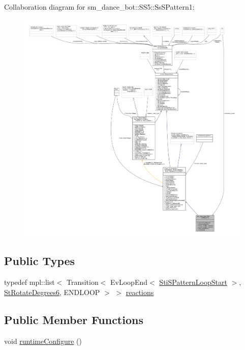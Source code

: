 Collaboration diagram for sm\+\_\+dance\+\_\+bot\+:\+:S\+S5\+:\+:Ss\+S\+Pattern1\+:
\nopagebreak
\begin{figure}[H]
\begin{center}
\leavevmode
\includegraphics[width=350pt]{structsm__dance__bot_1_1SS5_1_1SsSPattern1__coll__graph}
\end{center}
\end{figure}
\subsection*{Public Types}
\begin{DoxyCompactItemize}
\item 
typedef mpl\+::list$<$ Transition$<$ Ev\+Loop\+End$<$ \hyperlink{structsm__dance__bot_1_1s__pattern__states_1_1StiSPatternLoopStart}{Sti\+S\+Pattern\+Loop\+Start} $>$, \hyperlink{structsm__dance__bot_1_1StRotateDegrees6}{St\+Rotate\+Degrees6}, E\+N\+D\+L\+O\+OP $>$ $>$ \hyperlink{structsm__dance__bot_1_1SS5_1_1SsSPattern1_a6c5b86a52543caf627a571c543f6eda8}{reactions}
\end{DoxyCompactItemize}
\subsection*{Public Member Functions}
\begin{DoxyCompactItemize}
\item 
void \hyperlink{structsm__dance__bot_1_1SS5_1_1SsSPattern1_a464b7a170494e7e6b64a43c45c7a3757}{runtime\+Configure} ()
\end{DoxyCompactItemize}
